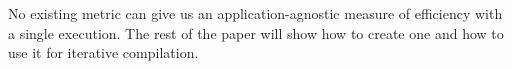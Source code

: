    No existing metric can give us an application-agnostic measure of efficiency with a single execution. The rest of the paper will show
    how to create one and how to use it for iterative compilation.


